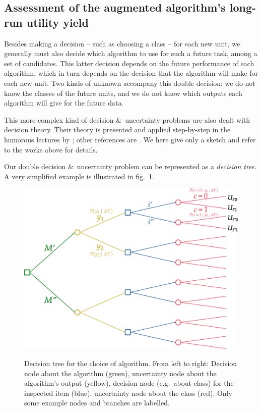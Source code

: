 \documentclass[\ifafour a4paper,12pt,\else a5paper,10pt,\fi%
onecolumn,oneside,article,%
british%
]{memoir}
\theoremstyle{remark}
\theoremstyle{innote}
\newcommand*{\amp}{\&}
\renewcommand*{\|}[1][]{\nonscript\:#1\vert\nonscript\:\mathopen{}}
\newcommand*{\sect}{\S}%
\newcommand*{\chap}{ch.}%
\newcommand*{\fig}{fig.}%
\newcommand*{\eg}{{e.g.}}
\begin{document}
\subsection{Assessment of the augmented algorithm's long-run utility yield}
\label{sec:algorithm_yield}

Besides making a decision -- such as choosing a class -- for each new unit, we generally must also decide which algorithm to use for such a future task, among a set of candidates. This latter decision depends on the future performance of each algorithm, which in turn depends on the decision that the algorithm will make for each new unit. Two kinds of unknown accompany this double decision: we do not know the classes of the future units, and we do not know which outputs each algorithm will give for the future data.

This more complex kind of decision \amp\ uncertainty problems are also dealt with decision theory. Their theory is presented  and applied step-by-step in the humorous lectures by \cites[\chap~2]{raiffa1968_r1970}; other references are  \autocites[\sect~2.2]{bernardoetal1994_r2000}{prattetal1995_r1996,raiffaetal1961_r2000,luceetal1957}. We here give only a sketch and refer to the works above for details.

Our double decision \amp\ uncertainty problem can be represented as a \emph{decision tree}. A very simplified example is illustrated in \fig~\ref{fig:decision_tree}.
\begin{figure}[!t]
  \centering
  \includegraphics[width=\linewidth]{decision_tree_algorithm.pdf}\\
  \caption{Decision tree for the choice of algorithm. From left to right: Decision node about the algorithm (green), uncertainty node about the algorithm's output (yellow), decision node (\eg\ about class) for the inspected item (blue), uncertainty node about the class (red). Only some example nodes and branches are labelled.}
  \label{fig:decision_tree}
\end{figure}
\end{document}
